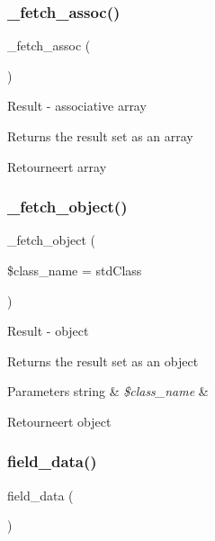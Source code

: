 \subsubsection{\texorpdfstring{\_fetch\_assoc()}{\_fetch\_assoc()}}
{\footnotesize\ttfamily \+\_\+fetch\+\_\+assoc (\begin{DoxyParamCaption}{ }\end{DoxyParamCaption})\hspace{0.3cm}{\ttfamily [protected]}}

Result -\/ associative array

Returns the result set as an array

\begin{DoxyReturn}{Retourneert}
array 
\end{DoxyReturn}
\mbox{\label{class_c_i___d_b__oci8__result_a60806be6a9c2488820813c2a7f4fef71}} 
\subsubsection{\texorpdfstring{\_fetch\_object()}{\_fetch\_object()}}
{\footnotesize\ttfamily \+\_\+fetch\+\_\+object (\begin{DoxyParamCaption}\item[{}]{\$class\+\_\+name = {\ttfamily \textquotesingle{}stdClass\textquotesingle{}} }\end{DoxyParamCaption})\hspace{0.3cm}{\ttfamily [protected]}}

Result -\/ object

Returns the result set as an object


\begin{DoxyParams}[1]{Parameters}
string & {\em \$class\+\_\+name} & \\
\hline
\end{DoxyParams}
\begin{DoxyReturn}{Retourneert}
object 
\end{DoxyReturn}
\mbox{\label{class_c_i___d_b__oci8__result_a84bffd65e53902ade1591716749a33e3}} 
\subsubsection{\texorpdfstring{field\_data()}{field\_data()}}
{\footnotesize\ttfamily field\+\_\+data (\begin{DoxyParamCaption}{ }\end{DoxyParamCaption})}

